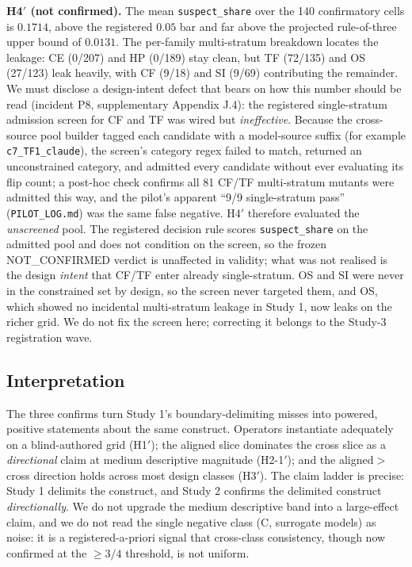 \documentclass[manuscript,screen,review]{acmart}
\begin{document}
\textbf{H4\('\) (not confirmed).} The mean \texttt{suspect\_share} over
the 140 confirmatory cells is \(0.1714\), above the registered \(0.05\)
bar and far above the projected rule-of-three upper bound of \(0.0131\).
The per-family multi-stratum breakdown locates the leakage: CE
(0/207) and HP (0/189) stay clean, but TF (72/135) and OS (27/123) leak
heavily, with CF (9/18) and SI (9/69) contributing the remainder. We must
disclose a design-intent defect that bears on how this number should be
read (incident P8, supplementary Appendix J.4): the registered
single-stratum admission screen for CF and TF was wired but
\emph{ineffective}. Because the cross-source pool builder tagged each
candidate with a model-source suffix (for example \texttt{c7\_TF1\_claude}),
the screen's category regex failed to match, returned an unconstrained
category, and admitted every candidate without ever evaluating its flip
count; a post-hoc check confirms all 81 CF/TF multi-stratum mutants were
admitted this way, and the pilot's apparent ``9/9 single-stratum pass''
(\texttt{PILOT\_LOG.md}) was the same false negative. H4\('\) therefore
evaluated the \emph{unscreened} pool. The registered decision rule scores
\texttt{suspect\_share} on the admitted pool and does not condition on the
screen, so the frozen NOT\_CONFIRMED verdict is unaffected in validity; what
was not realised is the design \emph{intent} that CF/TF enter already
single-stratum. OS and SI were never in the constrained set by design, so
the screen never targeted them, and OS, which showed no incidental
multi-stratum leakage in Study 1, now leaks on the richer grid. We do not
fix the screen here; correcting it belongs to the Study-3 registration wave.

\subsection{Interpretation}\label{study2-interpretation}

The three confirms turn Study 1's boundary-delimiting misses into
powered, positive statements about the same construct. Operators
instantiate adequately on a blind-authored grid (H1\('\)); the aligned
slice dominates the cross slice as a \emph{directional} claim at medium
descriptive magnitude (H2-1\('\)); and the aligned\(>\)cross direction
holds across most design classes (H3\('\)). The claim ladder is precise:
Study 1 delimits the construct, and Study 2 confirms the delimited
construct \emph{directionally}. We do not upgrade the medium descriptive
band into a large-effect claim, and we do not read the single negative
class (C, surrogate models) as noise: it is a registered-a-priori signal
that cross-class consistency, though now confirmed at the \(\geq 3/4\)
threshold, is not uniform.
\end{document}
